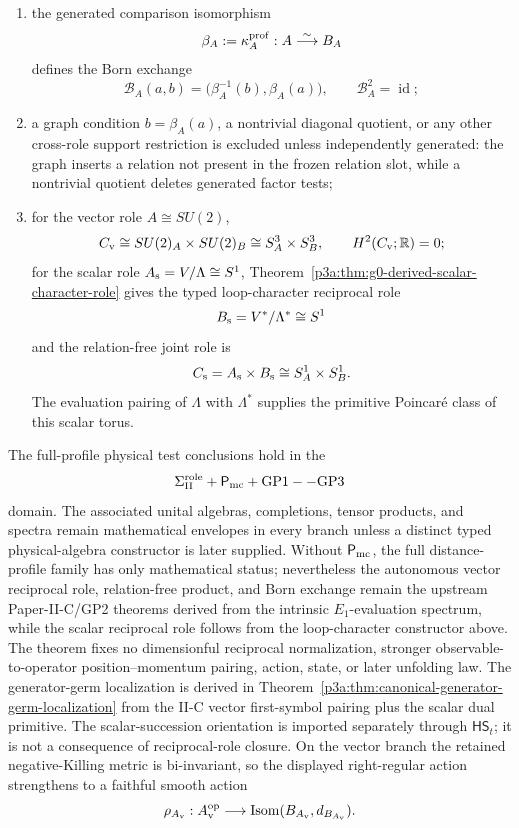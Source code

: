 \documentclass[11pt,a4paper]{article}
\begin{document}
\begin{theorem}
\begin{enumerate}[label=(\roman*),leftmargin=2.2em]
\[
 \overline{\mathscr T_A^{\rm math}}^{\|\cdot\|_\infty}=C(A),
\qquad
 \overline{\mathscr T_{B_A}^{\rm math}}^{\|\cdot\|_\infty}
 =C(B_A^{\rm math}),
\]
and ordinary commutative \(C^*\)-theory gives
\[
 C(A)\widehat\otimes C(B_A^{\rm math})
 \cong C(A\times B_A^{\rm math}).
\]
These identities do not assert physical algebra or spectrum outputs;
\item the generated comparison isomorphism
\[
 \beta_A:=\kappa_A^{\rm prof}:A\stackrel{\sim}{\longrightarrow}B_A
\]
defines the Born exchange
\[
 \mathcal B_A(a,b)
 =\bigl(\beta_A^{-1}(b),\beta_A(a)\bigr),
 \qquad
 \mathcal B_A^2=\operatorname{id};
\]
\item a graph condition \(b=\beta_A(a)\), a nontrivial diagonal quotient, or
any other cross-role support restriction is excluded unless independently
generated: the graph inserts a relation not present in the frozen relation
slot, while a nontrivial quotient deletes generated factor tests;
\item for the vector role \(A\cong SU(2)\),
\[
 C_{\rm v}\cong SU(2)_A\times SU(2)_B
 \cong S^3_A\times S^3_B,
 \qquad H^2(C_{\rm v};\mathbb R)=0;
\]
for the scalar role \(A_{\rm s}=V/\Lambda\cong S^1\),
Theorem~\ref{p3a:thm:g0-derived-scalar-character-role} gives the typed
loop-character reciprocal role
\[
 B_{\rm s}=V^*/\Lambda^*\cong S^1
\]
and the relation-free joint role is
\[
 C_{\rm s}=A_{\rm s}\times B_{\rm s}\cong S^1_A\times S^1_B.
\]
The evaluation pairing of \(\Lambda\) with \(\Lambda^*\) supplies the
primitive Poincar\'e class of this scalar torus.
\end{enumerate}
The full-profile physical test conclusions hold in the
\[
 \Sigma_{\rm II}^{\rm role}+\mathsf P_{\rm mc}+\mathrm{GP1--GP3}
\]
domain.  The associated unital algebras, completions, tensor products, and
spectra remain mathematical envelopes in every branch unless a distinct typed
physical-algebra constructor is later supplied.  Without
\(\mathsf P_{\rm mc}\), the full distance-profile family has only mathematical
status; nevertheless the autonomous vector reciprocal role, relation-free
product, and Born exchange remain the upstream Paper-II-C/GP2 theorems derived
from the intrinsic \(E_1\)-evaluation spectrum, while the scalar reciprocal
role follows from the loop-character constructor above.  The theorem fixes no dimensionful reciprocal normalization, stronger
observable-to-operator position--momentum pairing, action, state, or later unfolding
law.  The generator-germ localization is derived in
Theorem~\ref{p3a:thm:canonical-generator-germ-localization} from the
II-C vector first-symbol pairing plus the scalar dual primitive.
The scalar-succession orientation is imported separately through
\(\mathsf{HS}_t\); it is not a consequence of reciprocal-role closure.  On
the vector branch the retained negative-Killing metric is bi-invariant, so
the displayed right-regular action strengthens to a faithful smooth action
\[
 \rho_{A_{\rm v}}:A_{\rm v}^{\rm op}
 \longrightarrow\operatorname{Isom}(B_{A_{\rm v}},d_{B_{A_{\rm v}}}).
\]
\end{theorem}
\end{document}
